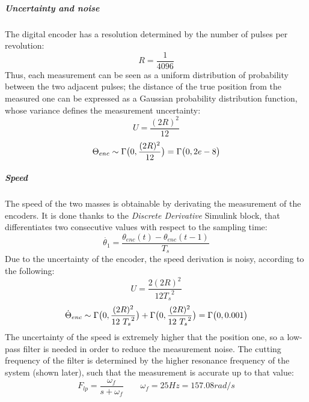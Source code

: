 \subparagraph{Uncertainty and noise}

The digital encoder has a resolution determined by the number of pulses per revolution:
\[
	R = \frac{1}{4096}
\]
Thus, each measurement can be seen as a uniform distribution of probability between the two adjacent pulses; the distance of the true position from the measured one can be expressed as a Gaussian probability distribution function, whose variance defines the measurement uncertainty:
\[
	U = \frac{(2R)^2}{12}
\]
\[
	\Theta_{enc} \sim \Gamma \bigl{(} 0,\frac{(2R)^2}{12} \bigr{)} = \Gamma \bigl{(} 0, 2e-8 \bigr{)}
\]

\subparagraph{Speed}

The speed of the two masses is obtainable by derivating the measurement of the encoders. It is done thanks to the \textit{Discrete Derivative} Simulink block, that differentiates two consecutive values with respect to the sampling time:
\[
	\dot{\theta_1} = \frac{ \theta_{enc}(t) - \theta_{enc}(t-1)}{T_s}
\]
Due to the uncertainty of the encoder, the speed derivation is noisy, according to the following:
\[
	U = \frac{2(2R)^2}{12 {T_s}^2 }
\]
\[
	\dot{\Theta}_{enc}	\sim \Gamma \bigl{(} 0,\frac{(2R)^2}{12 \ {T_s}^2} \bigr{)} + \Gamma \bigl{(} 0,\frac{(2R)^2}{12 \ {T_s}^2} \bigr{)} = \Gamma \bigl{(} 0, 0.001 \bigr{)}
\]
The uncertainty of the speed is extremely higher that the position one, so a low-pass filter is needed in order to reduce the measurement noise. The cutting frequency of the filter is determined by the higher resonance frequency of the system (shown later), such that the measurement is accurate up to that value:
\[
	F_{lp} = \frac{ \omega_f }{ s+\omega_f} \qquad \omega_f=25Hz=157.08 rad/s
\]
